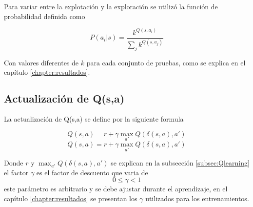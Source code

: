 Para variar entre la explotación y la exploración se utiliz\'o la función de probabilidad definida como  %


\begin{equation}
 P(a_{i} | s) = \dfrac{k^{Q(s,a_{i})}}{\sum_{j}k^{Q(s,a_{j})}}
\end{equation}

Con valores diferentes de $k$ para cada conjunto de pruebas, como se explica en el capítulo \ref{chapter:resultados}.  
 
 
\subsection{Actualizaci\'on de Q(s,a)}

La actualizaci\'on de Q(s,a) se define por la siguiente formula 
 
\begin{equation}
Q (s,a) = r + {\gamma\max_{a'}} Q(\delta(s ,a ) , a') 
\end{equation} 
\[Q(s,a) = r + \gamma \max_{a'} Q(\delta(s,a),a')\]


Donde $r$ y $\max_{a'} Q(\delta(s,a),a')$ se explican en la subsecci\'on \ref{subsec:Qlearning} el factor $\gamma$ es el factor de descuento que varia de \[   0 \leq  \gamma < 1 \] este par\'ametro es arbitrario y se debe ajustar durante el aprendizaje, en el cap\'itulo \ref{chapter:resultados}  se presentan los $\gamma$ utilizados para los entrenamientos.
